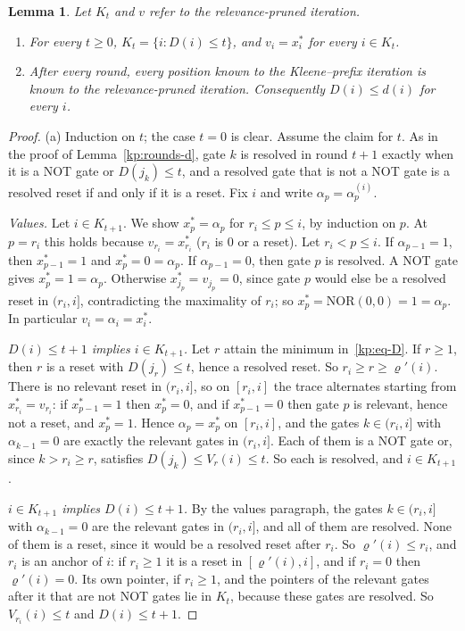 \documentclass[11pt]{amsart}
\newtheorem{lemma}[theorem]{Lemma}
\theoremstyle{definition}
\theoremstyle{remark}
\newcommand{\NOR}{\mathrm{NOR}}
\begin{document}
\begin{lemma}\label{kp:pruned}
Let $K_t$ and $v$ refer to the relevance-pruned iteration.
\begin{enumerate}[label=\textup{(\alph*)},leftmargin=2em]
\item For every $t\ge 0$, $K_t=\{i: D(i)\le t\}$, and $v_i=x^*_i$ for every
  $i\in K_t$.
\item After every round, every position known to the Kleene--prefix iteration
  is known to the relevance-pruned iteration. Consequently $D(i)\le d(i)$ for
  every $i$.
\end{enumerate}
\end{lemma}

\begin{proof}
(a) Induction on $t$; the case $t=0$ is clear. Assume the claim for $t$. As in
the proof of Lemma~\ref{kp:rounds-d}, gate $k$ is resolved in round $t+1$
exactly when it is a NOT gate or $D(j_k)\le t$, and a resolved gate that is not
a NOT gate is a resolved reset if and only if it is a reset. Fix $i$ and write
$\alpha_p=\alpha^{(i)}_p$.

\emph{Values.} Let $i\in K_{t+1}$. We show $x^*_p=\alpha_p$ for
$r_i\le p\le i$, by induction on $p$. At $p=r_i$ this holds because
$v_{r_i}=x^*_{r_i}$ ($r_i$ is $0$ or a reset). Let $r_i<p\le i$. If
$\alpha_{p-1}=1$, then $x^*_{p-1}=1$ and $x^*_p=0=\alpha_p$. If
$\alpha_{p-1}=0$, then gate $p$ is resolved. A NOT gate gives
$x^*_p=1=\alpha_p$. Otherwise $x^*_{j_p}=v_{j_p}=0$, since gate $p$ would else be
a resolved reset in $(r_i,i]$, contradicting the maximality of $r_i$; so
$x^*_p=\NOR(0,0)=1=\alpha_p$. In particular $v_i=\alpha_i=x^*_i$.

\emph{$D(i)\le t+1$ implies $i\in K_{t+1}$.} Let $r$ attain the minimum
in~\eqref{kp:eq-D}. If $r\ge 1$, then $r$ is a reset with $D(j_r)\le t$, hence a
resolved reset. So $r_i\ge r\ge\varrho'(i)$. There is no relevant reset in
$(r_i,i]$, so on $[r_i,i]$ the trace alternates starting from
$x^*_{r_i}=v_{r_i}$: if $x^*_{p-1}=1$ then $x^*_p=0$, and if $x^*_{p-1}=0$ then
gate $p$ is relevant, hence not a reset, and $x^*_p=1$. Hence $\alpha_p=x^*_p$
on $[r_i,i]$, and the gates $k\in(r_i,i]$ with $\alpha_{k-1}=0$ are exactly the
relevant gates in $(r_i,i]$. Each of them is a NOT gate or, since $k>r_i\ge r$,
satisfies $D(j_k)\le V_r(i)\le t$. So each is resolved, and $i\in K_{t+1}$.

\emph{$i\in K_{t+1}$ implies $D(i)\le t+1$.} By the values paragraph, the gates
$k\in(r_i,i]$ with $\alpha_{k-1}=0$ are the relevant gates in $(r_i,i]$, and all
of them are resolved. None of them is a reset, since it would be a resolved
reset after $r_i$. So $\varrho'(i)\le r_i$, and $r_i$ is an anchor of $i$: if
$r_i\ge 1$ it is a reset in $[\varrho'(i),i]$, and if $r_i=0$ then
$\varrho'(i)=0$. Its own pointer, if $r_i\ge 1$, and the pointers of the
relevant gates after it that are not NOT gates lie in $K_t$, because these
gates are resolved. So $V_{r_i}(i)\le t$ and $D(i)\le t+1$.


\end{proof}
\end{document}
